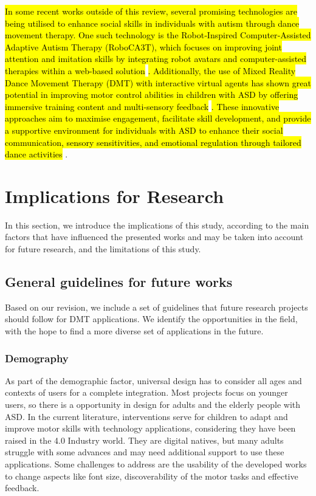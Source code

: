 \documentclass[a4paper,fleqn]{cas-sc}
\begin{document}
\hl{In some recent works outside of this review, several promising technologies are being utilised to enhance social skills in individuals with autism through dance movement therapy. One such technology is the Robot‐Inspired Computer‐Assisted Adaptive Autism Therapy (RoboCA3T), which focuses on improving joint attention and imitation skills by integrating robot avatars and computer-assisted therapies within a web-based solution} \cite{Zahid24}\hl{. Additionally, the use of Mixed Reality Dance Movement Therapy (DMT) with interactive virtual agents has shown great potential in improving motor control abilities in children with ASD by offering immersive training content and multi-sensory feedback} \cite{Liu24}\hl{. These innovative approaches aim to maximise engagement, facilitate skill development, and provide a supportive environment for individuals with ASD to enhance their social communication, sensory sensitivities, and emotional regulation through tailored dance activities} \cite{Makheti24}.


\section{Implications for Research}
\label{sec6:implications}
In this section, we introduce the implications of this study, according to the main factors that have influenced the presented works and may be taken into account for future research, and the limitations of this study.

\subsection{General guidelines for future works}
Based on our revision, we include a set of guidelines that future research projects should follow for DMT applications. We identify the opportunities in the field, with the hope to find a more diverse set of applications in the future.

\subsubsection{Demography}

As part of the demographic factor, universal design has to consider all ages and contexts of users for a complete integration. Most projects focus on younger users, so there is a opportunity in design for adults and the elderly people with ASD. In the current literature, interventions serve for children to adapt and improve motor skills with technology applications, considering they have been raised in the 4.0 Industry world. They are digital natives, but many adults struggle with some advances and may need additional support to use these applications. Some challenges to address are the usability of the developed works to change aspects like font size, discoverability of the motor tasks and effective feedback.
\end{document}
